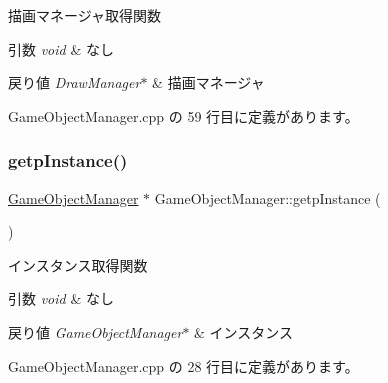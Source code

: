 描画マネージャ取得関数 


\begin{DoxyParams}{引数}
{\em void} & なし \\
\hline
\end{DoxyParams}

\begin{DoxyRetVals}{戻り値}
{\em Draw\+Manager$\ast$} & 描画マネージャ \\
\hline
\end{DoxyRetVals}


 Game\+Object\+Manager.\+cpp の 59 行目に定義があります。

\mbox{\label{class_game_object_manager_abd04286fb8e2ac72a5f0468263f9553d}} 
\subsubsection{\texorpdfstring{getp\+Instance()}{getpInstance()}}
{\footnotesize\ttfamily \mbox{\hyperlink{class_game_object_manager}{Game\+Object\+Manager}} $\ast$ Game\+Object\+Manager\+::getp\+Instance (\begin{DoxyParamCaption}{ }\end{DoxyParamCaption})\hspace{0.3cm}{\ttfamily [static]}}



インスタンス取得関数 


\begin{DoxyParams}{引数}
{\em void} & なし \\
\hline
\end{DoxyParams}

\begin{DoxyRetVals}{戻り値}
{\em Game\+Object\+Manager$\ast$} & インスタンス \\
\hline
\end{DoxyRetVals}


 Game\+Object\+Manager.\+cpp の 28 行目に定義があります。

\mbox{\label{class_game_object_manager_a4804852e29b6cb4c065f6a60e5b95edd}} 
